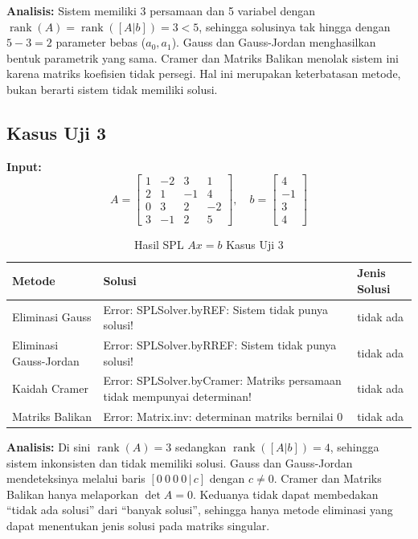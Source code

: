 \documentclass[12pt,a4paper]{report}
\begin{document}
\textbf{Analisis:} Sistem memiliki 3 persamaan dan 5 variabel dengan $\operatorname{rank}(A)=\operatorname{rank}([A|b])=3<5$, sehingga solusinya tak hingga dengan $5-3=2$ parameter bebas ($a_0,a_1$). Gauss dan Gauss-Jordan menghasilkan bentuk parametrik yang sama. Cramer dan Matriks Balikan menolak sistem ini karena matriks koefisien tidak persegi. Hal ini merupakan keterbatasan metode, bukan berarti sistem tidak memiliki solusi.

\subsection{Kasus Uji 3}
\textbf{Input:}
\[
A = \begin{bmatrix} 1 & -2 & 3 & 1  \\ 2 & 1 & -1 & 4 \\ 0 & 3 & 2 & -2 \\ 3 & -1 & 2 & 5 \end{bmatrix},
\quad
b = \begin{bmatrix}  4 \\ -1 \\ 3 \\4\end{bmatrix}
\]
 
 
\begin{table}[H]
    \centering
    \caption{Hasil SPL $Ax=b$ Kasus Uji 3}
    \begin{tabular}{|l|p{5cm}|l|}
        \hline
        \textbf{Metode} & \textbf{Solusi} & \textbf{Jenis Solusi} \\
        \hline
        Eliminasi Gauss & 
        Error: SPLSolver.byREF: Sistem tidak punya solusi!
        & tidak ada \\
        \hline
        Eliminasi Gauss-Jordan & 
        Error: SPLSolver.byRREF: Sistem tidak punya solusi!
        & tidak ada \\
        \hline
        Kaidah Cramer & 
        Error: SPLSolver.byCramer: Matriks persamaan tidak mempunyai determinan!
        & tidak ada \\
        \hline
        Matriks Balikan & 
        Error: Matrix.inv: determinan matriks bernilai 0
        & tidak ada \\
        \hline
    \end{tabular}
\end{table}
 
\textbf{Analisis:} Di sini $\operatorname{rank}(A)=3$ sedangkan $\operatorname{rank}([A|b])=4$, sehingga sistem inkonsisten dan tidak memiliki solusi. Gauss dan Gauss-Jordan mendeteksinya melalui baris $[0\ 0\ 0\ 0\,|\,c]$ dengan $c\neq 0$. Cramer dan Matriks Balikan hanya melaporkan $\det A=0$. Keduanya tidak dapat membedakan ``tidak ada solusi'' dari ``banyak solusi'', sehingga hanya metode eliminasi yang dapat menentukan jenis solusi pada matriks singular.
\end{document}
